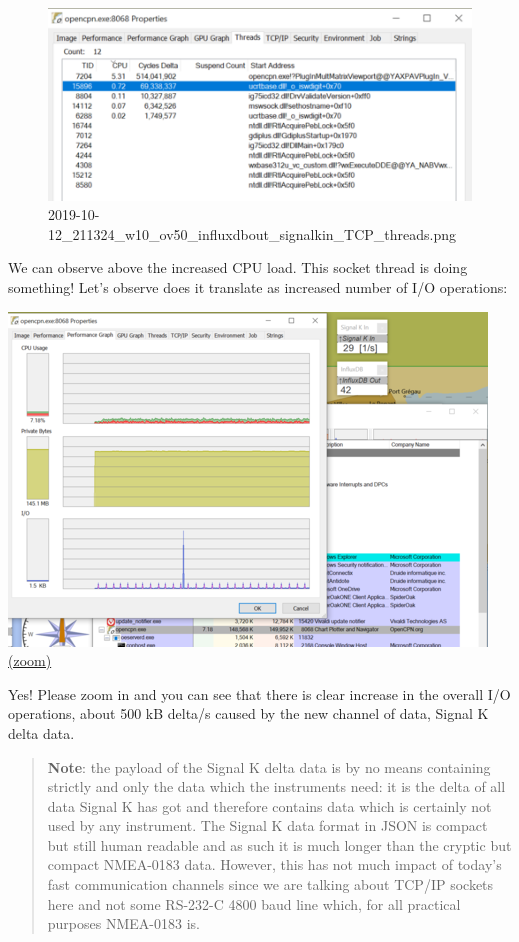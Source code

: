 \documentclass[11pt]{article}
\begin{document}
    \begin{figure}
\centering
\includegraphics{2019-10-12_211324_w10_ov50_influxdbout_signalkin_TCP_threads.png}
\caption{2019-10-12\_211324\_w10\_ov50\_influxdbout\_signalkin\_TCP\_threads.png}
\end{figure}

    We can observe above the increased CPU load. This socket thread is doing
something! Let's observe does it translate as increased number of I/O
operations:

    \includegraphics{2019-10-12_211323_w10_ov50_influxdbout_signalkin_TCP_perfgraph.png}
\href{img/2019-10-12_211323_w10_ov50_influxdbout_signalkin_TCP_perfgraph.png}{(zoom)}

    Yes! Please zoom in and you can see that there is clear increase in the
overall I/O operations, about 500 kB delta/s caused by the new channel
of data, Signal K delta data.

    \begin{quote}
\textbf{Note}: the payload of the Signal K delta data is by no means
containing strictly and only the data which the instruments need: it is
the delta of all data Signal K has got and therefore contains data which
is certainly not used by any instrument. The Signal K data format in
JSON is compact but still human readable and as such it is much longer
than the cryptic but compact NMEA-0183 data. However, this has not much
impact of today's fast communication channels since we are talking about
TCP/IP sockets here and not some RS-232-C 4800 baud line which, for all
practical purposes NMEA-0183 is.
\end{quote}
\end{document}
